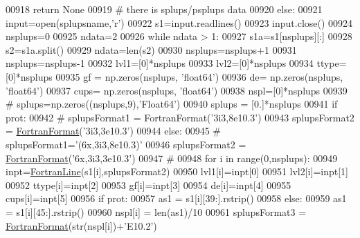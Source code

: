\begin{DoxyCode}
{{{{{{{{{{{{00918             \textcolor{keywordflow}{return} \textcolor{keywordtype}{None}
00919     \textcolor{comment}{# there is splups/psplups data}
00920     \textcolor{keywordflow}{else}:
00921         input=open(splupsname,\textcolor{stringliteral}{'}\textcolor{stringliteral}{r')}
00922 \textcolor{stringliteral}{        s1=input.readlines()}
00923 \textcolor{stringliteral}{        input.close()}
00924 \textcolor{stringliteral}{        nsplups=0}
00925 \textcolor{stringliteral}{        ndata=2}
00926 \textcolor{stringliteral}{        }\textcolor{keywordflow}{while} ndata > 1:
00927             s1a=s1[nsplups][:]
00928             s2=s1a.split()
00929             ndata=len(s2)
00930             nsplups=nsplups+1
00931         nsplups=nsplups-1
00932         lvl1=[0]*nsplups
00933         lvl2=[0]*nsplups
00934         ttype=[0]*nsplups
00935         gf = np.zeros(nsplups, \textcolor{stringliteral}{'float64'})
00936         de= np.zeros(nsplups, \textcolor{stringliteral}{'float64'})
00937         cups= np.zeros(nsplups, \textcolor{stringliteral}{'float64'})
00938         nspl=[0]*nsplups
00939 \textcolor{comment}{#        splups=np.zeros((nsplups,9),'Float64')}
00940         splups = [0.]*nsplups
00941         \textcolor{keywordflow}{if} prot:
00942 \textcolor{comment}{#            splupsFormat1 = FortranFormat('3i3,8e10.3')}
00943             splupsFormat2 = \hyperlink{classpyneb_1_1utils_1_1_fortran_format_1_1_fortran_format}{FortranFormat}(\textcolor{stringliteral}{'3i3,3e10.3'})
00944         \textcolor{keywordflow}{else}:
00945 \textcolor{comment}{#            splupsFormat1='(6x,3i3,8e10.3)'}
00946             splupsFormat2 = \hyperlink{classpyneb_1_1utils_1_1_fortran_format_1_1_fortran_format}{FortranFormat}(\textcolor{stringliteral}{'6x,3i3,3e10.3'})
00947         \textcolor{comment}{#}
00948         \textcolor{keywordflow}{for} i \textcolor{keywordflow}{in} range(0,nsplups):
00949             inpt=\hyperlink{classpyneb_1_1utils_1_1_fortran_format_1_1_fortran_line}{FortranLine}(s1[i],splupsFormat2)
00950             lvl1[i]=inpt[0]
00951             lvl2[i]=inpt[1]
00952             ttype[i]=inpt[2]
00953             gf[i]=inpt[3]
00954             de[i]=inpt[4]
00955             cups[i]=inpt[5]
00956             \textcolor{keywordflow}{if} prot:
00957                 as1 = s1[i][39:].rstrip()
00958             \textcolor{keywordflow}{else}:
00959                 as1 = s1[i][45:].rstrip()
00960             nspl[i] = len(as1)/10
00961             splupsFormat3 = \hyperlink{classpyneb_1_1utils_1_1_fortran_format_1_1_fortran_format}{FortranFormat}(str(nspl[i])+\textcolor{stringliteral}{'E10.2'})
}}}}}}}}}}}}
\end{DoxyCode}
